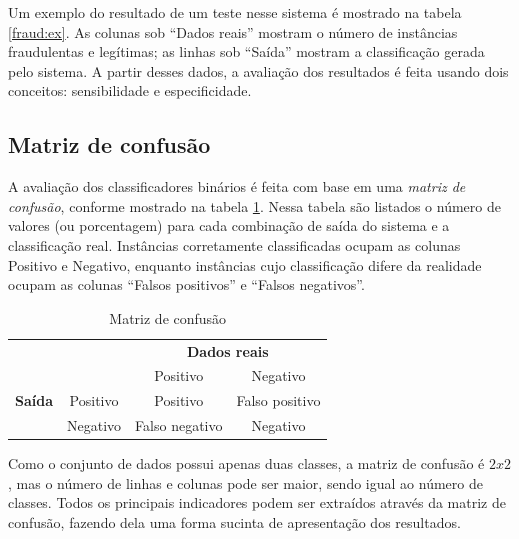 Um exemplo do resultado de um teste nesse sistema é mostrado na tabela \ref{fraud:ex}. As colunas sob ``Dados reais'' mostram o número de instâncias fraudulentas e legítimas; as linhas sob ``Saída'' mostram a classificação gerada pelo sistema. A partir desses dados, a avaliação dos resultados é feita usando dois conceitos: sensibilidade e especificidade.

\subsection{Matriz de confusão}

A avaliação dos classificadores binários é feita com base em uma \emph{matriz de confusão}, conforme mostrado na tabela \ref{fraud:confusion}. Nessa tabela são listados o número de valores (ou porcentagem) para cada combinação de saída do sistema e a classificação real. Instâncias corretamente classificadas ocupam as colunas Positivo e Negativo, enquanto instâncias cujo classificação difere da realidade ocupam as colunas ``Falsos positivos'' e ``Falsos negativos''.

\vspace{0.5cm}
\renewcommand{\arraystretch}{1.5}
\begin{table}[h]
    \centering
    \caption{Matriz de confusão}
    \label{fraud:confusion}
    \vspace{0.5cm}
    \begin{tabular}{c l c c}
        & & \multicolumn{2}{c}{\textbf{Dados reais}} \\
        \multirow{3}{5mm}{\begin{sideways}\parbox{20mm}{\textbf{Saída}}\end{sideways}} & \multicolumn{1}{c|}{} & Positivo & Negativo \\
        \cline{2-4}
        & \multicolumn{1}{c|}{Positivo} & Positivo & Falso positivo\\
        & \multicolumn{1}{c|}{Negativo} & Falso negativo & Negativo\\
    \end{tabular}
\end{table}
\vspace{0.5cm}

Como o conjunto de dados possui apenas duas classes, a matriz de confusão é $2 x 2$, mas o número de linhas e colunas pode ser maior, sendo igual ao número de classes. Todos os principais indicadores podem ser extraídos através da matriz de confusão, fazendo dela uma forma sucinta de apresentação dos resultados.

